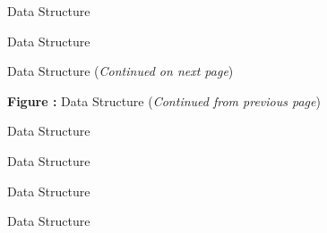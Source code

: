 \clearpage
\begin{figure}[!htp]
\centering

\caption{ Data Structure}
\label{f:OversetHoles}
\end{figure}

\clearpage
\begin{figure}[!htp]
\centering

\caption{ Data Structure}
\label{f:ZoneBC}
\end{figure}


\clearpage
\begin{figure}[!htp]
\centering
\resizebox{\linewidth}{!}{}
\caption[ Data Structure]{ Data Structure (\textit{Continued on next page})}
\label{f:BC}
\end{figure}
\clearpage
\begin{figure}[!htp]
\centering
\resizebox{\linewidth}{!}{}
\par\vspace{\abovecaptionskip}
\textbf{Figure :}  Data Structure (\textit{Continued from previous page})
\end{figure}

\clearpage
\begin{figure}[!htp]
\centering
%
\resizebox{!}{\textheight-2\baselineskip}{}
\caption{ Data Structure}
\label{f:BCDataSet}
\end{figure}

\clearpage
\begin{figure}[!htp]
\centering

\caption{ Data Structure}
\label{f:BCData}
\end{figure}

\clearpage
\begin{figure}[!htp]
\centering

\caption{ Data Structure}
\label{f:BCProperty}
\end{figure}

\clearpage
\begin{figure}[!htp]
\centering

\caption{ Data Structure}
\label{f:WallFunction}
\end{figure}

